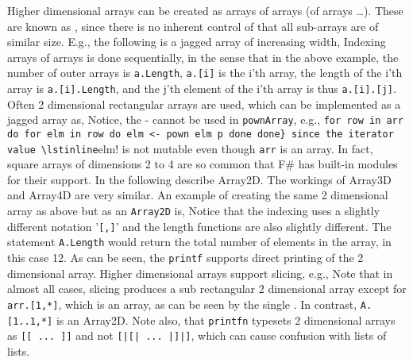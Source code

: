 Higher dimensional arrays can be created as arrays of arrays (of arrays \dots). These are known as , since there is no inherent control of that all sub-arrays are of similar size. E.g., the following is a jagged array of increasing width,
%
%
Indexing arrays of arrays is done sequentially, in the sense that in the above example, the number of outer arrays is \lstinline|a.Length|,  \lstinline|a.[i]| is the i'th array, the length of the i'th array is \lstinline|a.[i].Length|, and the j'th element of the i'th array is thus \lstinline|a.[i].[j]|. Often 2 dimensional rectangular arrays are used, which can be implemented as a jagged array as,
%
%
Notice, the - cannot be used in \lstinline!pownArray!, e.g., \lstinline!for row in arr do for elm in row do elm <- pown elm p done done} since the iterator value \lstinline!elm! is not mutable even though \lstinline!arr! is an array.
%
In fact, square arrays of dimensions 2 to 4 are so common that F\# has built-in modules for their support. In the following describe Array2D. The workings of Array3D and Array4D are very similar. An example of creating the same 2 dimensional array as above but as an \texttt{Array2D} is,
%
%
Notice that the indexing uses a slightly different notation '\verb|[,]|' and the length functions are also slightly different. The statement \verb|A.Length| would return the total number of elements in the array, in this case 12. As can be seen, the \lstinline!printf! supports direct printing of the 2 dimensional array. Higher dimensional arrays support slicing, e.g.,
%
%
Note that in almost all cases, slicing produces a sub rectangular 2 dimensional array except for \lstinline{arr.[1,*]}, which is an array, as can be seen by the single \lexeme{[}. In contrast, \lstinline{A.[1..1,*]} is an Array2D. Note also, that \lstinline!printfn! typesets 2 dimensional arrays as \lstinline{[[ ... ]]} and not \lstinline{[|[| ... |]|]}, which can cause confusion with lists of lists.

